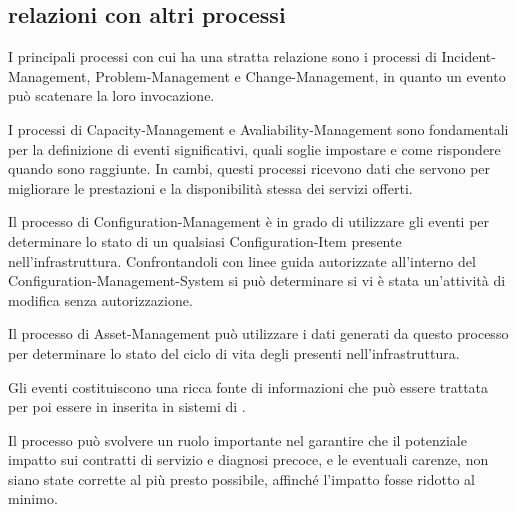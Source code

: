 \subsection[Relazioni con altri processi]{relazioni con altri processi}
\label{prc-event-relationship}
I principali processi con cui ha una stratta relazione sono i processi di \acf{Incident-Management}, \acf{Problem-Management} e \acf{Change-Management}, in quanto un evento può scatenare la loro invocazione.

I processi di \acf{Capacity-Management} e \acf{Avaliability-Management} sono fondamentali per la definizione di eventi significativi, quali soglie impostare e come rispondere quando sono raggiunte. In cambi, questi processi ricevono dati che servono per migliorare le prestazioni e la disponibilità stessa dei servizi offerti.

Il processo di \acf{Configuration-Management} è in grado di utilizzare gli eventi per determinare lo stato di un qualsiasi \ac{Configuration-Item} presente nell'infrastruttura. Confrontandoli con linee guida autorizzate all'interno del \ac{Configuration-Management-System} si può determinare si vi è stata un'attività di modifica senza autorizzazione.

Il processo di \acf{Asset-Management} può utilizzare i dati generati da questo processo per determinare lo stato del ciclo di vita degli  presenti nell'infrastruttura.

Gli eventi costituiscono una ricca fonte di informazioni che può essere trattata per poi essere in inserita in sistemi di .

Il processo può svolvere un ruolo importante nel garantire che il potenziale impatto sui contratti di servizio e diagnosi precoce, e le eventuali carenze, non siano state corrette al più presto possibile, affinché l'impatto fosse ridotto al minimo.